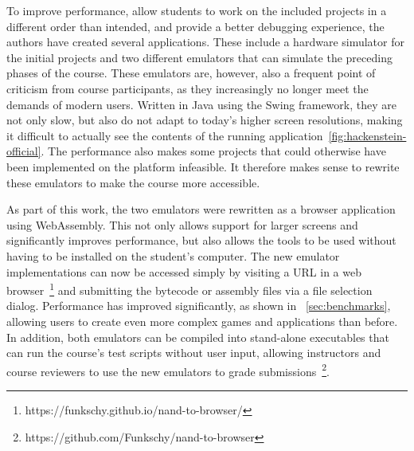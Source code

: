 To improve performance, allow students to work on the included projects in a different order than intended, and provide a better debugging experience, the authors have created several applications.
These include a hardware simulator for the initial projects and two different emulators that can simulate the preceding phases of the course.
These emulators are, however, also a frequent point of criticism from course participants, as they increasingly no longer meet the demands of modern users.
Written in Java using the Swing framework, they are not only slow, but also do not adapt to today's higher screen resolutions, making it difficult to actually see the contents of the running application~\ref{fig:hackenstein-official}.
The performance also makes some projects that could otherwise have been implemented on the platform infeasible.
It therefore makes sense to rewrite these emulators to make the course more accessible.

As part of this work, the two emulators were rewritten as a browser application using WebAssembly. This not only allows support for larger screens and significantly improves performance, but also allows the tools to be used without having to be installed on the student's computer.
The new emulator implementations can now be accessed simply by visiting a URL in a web browser~\footnote{https://funkschy.github.io/nand-to-browser/} and submitting the bytecode or assembly files via a file selection dialog. Performance has improved significantly, as shown in ~\cref{sec:benchmarks}, allowing users to create even more complex games and applications than before.
In addition, both emulators can be compiled into stand-alone executables that can run the course's test scripts without user input, allowing instructors and course reviewers to use the new emulators to grade submissions~\footnote{https://github.com/Funkschy/nand-to-browser}.
